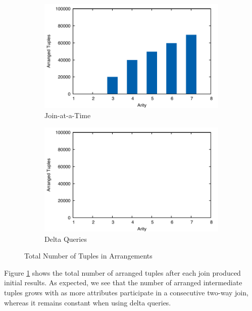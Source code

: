 \documentclass[../catalog.tex]{subfiles}
\begin{document}
\begin{figure}[h!]
  \begin{subfigure}{1.0\textwidth}
    \includegraphics[width=1.0\linewidth]{results/join-state/out/tuples_join}
    \caption{Join-at-a-Time}
  \end{subfigure}
  \begin{subfigure}{1.0\textwidth}
    \includegraphics[width=1.0\linewidth]{results/join-state/out/tuples_delta}
    \caption{Delta Queries}
  \end{subfigure}

  \caption{Total Number of Tuples in Arrangements}
  \label{fig:tuple-counts}
\end{figure}

Figure \ref{fig:tuple-counts} shows the total number of arranged
tuples after each join produced initial results. As expected, we see
that the number of arranged intermediate tuples grows with as more
attributes participate in a consecutive two-way join, whereas it
remains constant when using delta queries.
\end{document}
